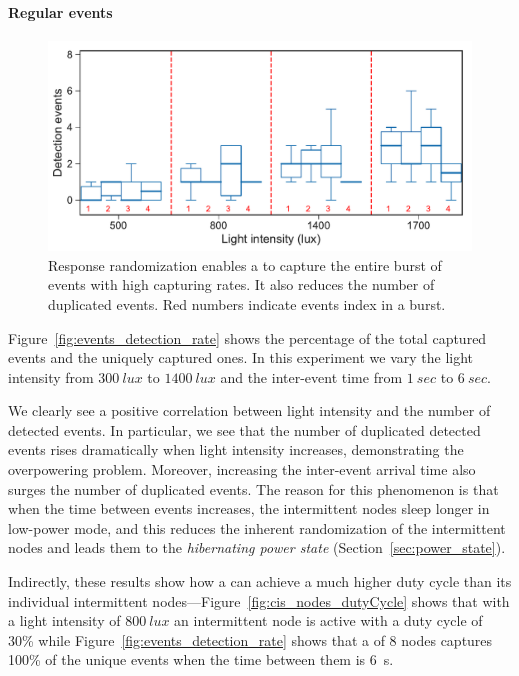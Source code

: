 \paragraph{Regular events}
\begin{figure}[t]
	\centering
     \includegraphics[width=\columnwidth]{figures/events_burst_rand}
    \caption{Response randomization enables a \sys to capture the entire burst of events with high capturing rates. It also reduces the number of duplicated events. Red numbers indicate events index in a burst.}
    \label{fig:events_burst_rand}
\end{figure}

Figure~\ref{fig:events_detection_rate} shows the percentage of the total captured events and the uniquely captured ones. In this experiment we vary the light intensity from $\SI{300}{lux}$ to $\SI{1400}{lux}$ and the inter-event time from $\SI{1}{sec}$ to $\SI{6}{sec}$. 

We clearly see a positive correlation between light intensity and the number of detected events. In particular, we see that the number of duplicated detected events rises dramatically when light intensity increases, demonstrating the overpowering problem. Moreover, increasing the inter-event arrival time also surges the number of duplicated events. The reason for this phenomenon is that when the time between events increases, the intermittent nodes sleep longer in low-power mode, and this reduces the inherent randomization of the intermittent nodes and leads them to the \textit{hibernating power state} (Section~\ref{sec:power_state}).  

Indirectly, these results show how a \sys can achieve a much higher duty cycle than its individual intermittent nodes---Figure~\ref{fig:cis_nodes_dutyCycle} shows that with a light intensity of $\SI{800}{lux}$ an intermittent node is active with a duty cycle of 30\% while Figure~\ref{fig:events_detection_rate} shows that a \sys of 8 nodes captures 100\% of the unique events when the time between them is \SI{6}{s}. 

